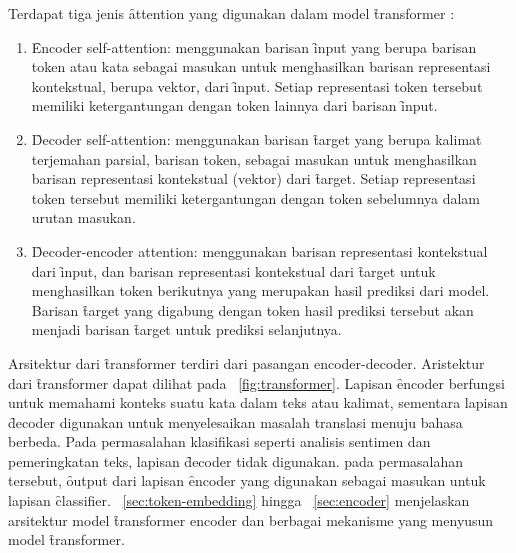 	Terdapat tiga jenis \f{attention} yang digunakan dalam model \f{transformer} \citep{transformerori}:
	\begin{enumerate}
		\item \f{Encoder self-attention}: menggunakan barisan \f{input} yang berupa barisan token atau kata sebagai masukan untuk menghasilkan barisan representasi kontekstual, berupa vektor, dari \f{input}. Setiap representasi token tersebut memiliki ketergantungan dengan token lainnya dari barisan \f{input}.
		\item \f{Decoder self-attention}: menggunakan barisan \f{target} yang berupa kalimat terjemahan parsial, barisan token, sebagai masukan untuk menghasilkan barisan representasi kontekstual (vektor) dari \f{target}. Setiap representasi token tersebut memiliki ketergantungan dengan token sebelumnya dalam urutan masukan.
		\item \f{Decoder-encoder attention}: menggunakan barisan representasi kontekstual dari \f{input}, dan barisan representasi kontekstual dari \f{target} untuk menghasilkan token berikutnya yang merupakan hasil prediksi dari model. Barisan \f{target} yang digabung dengan token hasil prediksi tersebut akan menjadi barisan \f{target} untuk prediksi selanjutnya.
	\end{enumerate}
	Arsitektur dari \f{transformer} terdiri dari pasangan encoder-decoder. Aristektur dari \f{transformer} dapat dilihat pada \pic~\ref{fig:transformer}. Lapisan \f{encoder} berfungsi untuk memahami konteks suatu kata dalam teks atau kalimat, sementara lapisan \f{decoder} digunakan untuk menyelesaikan masalah translasi menuju bahasa berbeda. Pada permasalahan klasifikasi seperti analisis sentimen dan pemeringkatan teks, lapisan \f{decoder} tidak digunakan. pada permasalahan tersebut, \f{output} dari lapisan \f{encoder} yang digunakan sebagai masukan untuk lapisan \f{classifier}. \sect~\ref{sec:token-embedding} hingga \sect~\ref{sec:encoder} menjelaskan arsitektur model \f{transformer encoder} dan berbagai mekanisme yang menyusun model \f{transformer}.

